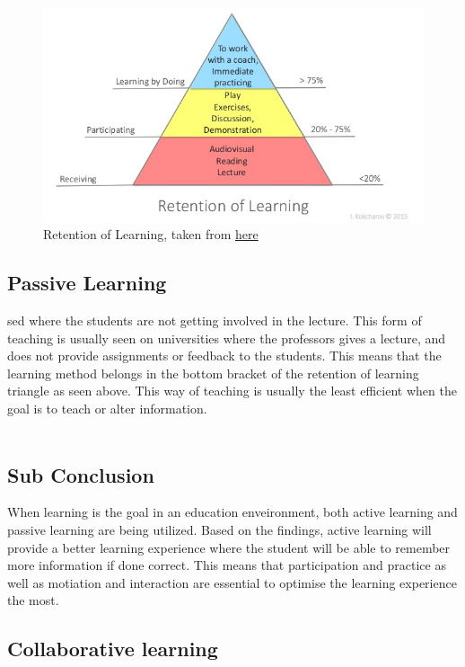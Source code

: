 		\begin{figure}[H]
			\centering
			\includegraphics[width=0.9\linewidth]{figure/Analysis/skillslearn}
			\caption{Retention of Learning, taken from \href{https://www.slideshare.net/igorkokcharov/kokcharov-skillpyramid2015}{\color{blue}here}}
			\label{fig:activelearn}
		\end{figure}
	
\subsection*{Passive Learning}
sed where the students are not getting involved in the lecture. This form of teaching is usually seen on universities where the professors gives a lecture, and does not provide assignments or feedback to the students. This means that the learning method belongs in the bottom bracket of the retention of learning triangle as seen above. This way of teaching is usually the least efficient when the goal is to teach or alter information.\\
	\\
	\subsection*{Sub Conclusion}
	When learning is the goal in an education enveironment, both active learning and passive learning are being utilized. Based on the findings, active learning will provide a better learning experience where the student will be able to remember more information if done correct. This means that participation and practice as well as motiation and interaction are essential to optimise the learning experience the most.
	   
	\subsection{Collaborative learning}
	
